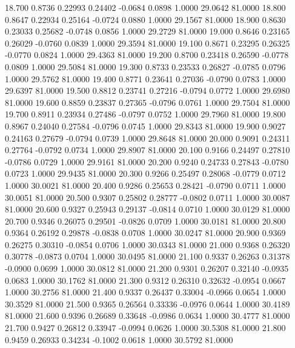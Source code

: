   18.700   0.8736   0.22993   0.24402  -0.0684   0.0898   1.0000  29.0642  81.0000
  18.800   0.8647   0.22934   0.25164  -0.0724   0.0880   1.0000  29.1567  81.0000
  18.900   0.8630   0.23033   0.25682  -0.0748   0.0856   1.0000  29.2729  81.0000
  19.000   0.8646   0.23165   0.26029  -0.0760   0.0839   1.0000  29.3594  81.0000
  19.100   0.8671   0.23295   0.26325  -0.0770   0.0824   1.0000  29.4363  81.0000
  19.200   0.8700   0.23418   0.26590  -0.0778   0.0809   1.0000  29.5084  81.0000
  19.300   0.8733   0.23533   0.26827  -0.0785   0.0796   1.0000  29.5762  81.0000
  19.400   0.8771   0.23641   0.27036  -0.0790   0.0783   1.0000  29.6397  81.0000
  19.500   0.8812   0.23741   0.27216  -0.0794   0.0772   1.0000  29.6980  81.0000
  19.600   0.8859   0.23837   0.27365  -0.0796   0.0761   1.0000  29.7504  81.0000
  19.700   0.8911   0.23934   0.27486  -0.0797   0.0752   1.0000  29.7960  81.0000
  19.800   0.8967   0.24040   0.27584  -0.0796   0.0745   1.0000  29.8343  81.0000
  19.900   0.9027   0.24163   0.27679  -0.0794   0.0739   1.0000  29.8648  81.0000
  20.000   0.9091   0.24311   0.27764  -0.0792   0.0734   1.0000  29.8907  81.0000
  20.100   0.9166   0.24497   0.27810  -0.0786   0.0729   1.0000  29.9161  81.0000
  20.200   0.9240   0.24733   0.27843  -0.0780   0.0723   1.0000  29.9435  81.0000
  20.300   0.9266   0.25497   0.28068  -0.0779   0.0712   1.0000  30.0021  81.0000
  20.400   0.9286   0.25653   0.28421  -0.0790   0.0711   1.0000  30.0051  81.0000
  20.500   0.9307   0.25802   0.28777  -0.0802   0.0711   1.0000  30.0087  81.0000
  20.600   0.9327   0.25943   0.29137  -0.0814   0.0710   1.0000  30.0129  81.0000
  20.700   0.9346   0.26075   0.29501  -0.0826   0.0709   1.0000  30.0181  81.0000
  20.800   0.9364   0.26192   0.29878  -0.0838   0.0708   1.0000  30.0247  81.0000
  20.900   0.9369   0.26275   0.30310  -0.0854   0.0706   1.0000  30.0343  81.0000
  21.000   0.9368   0.26320   0.30778  -0.0873   0.0704   1.0000  30.0495  81.0000
  21.100   0.9337   0.26263   0.31378  -0.0900   0.0699   1.0000  30.0812  81.0000
  21.200   0.9301   0.26207   0.32140  -0.0935   0.0683   1.0000  30.1762  81.0000
  21.300   0.9312   0.26310   0.32632  -0.0954   0.0667   1.0000  30.2756  81.0000
  21.400   0.9337   0.26437   0.33004  -0.0966   0.0654   1.0000  30.3529  81.0000
  21.500   0.9365   0.26564   0.33336  -0.0976   0.0644   1.0000  30.4189  81.0000
  21.600   0.9396   0.26689   0.33648  -0.0986   0.0634   1.0000  30.4777  81.0000
  21.700   0.9427   0.26812   0.33947  -0.0994   0.0626   1.0000  30.5308  81.0000
  21.800   0.9459   0.26933   0.34234  -0.1002   0.0618   1.0000  30.5792  81.0000
